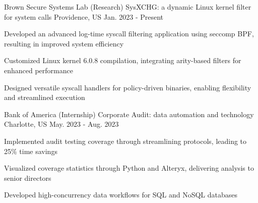 \begin{cventries}

  \cventry
    {Brown Secure Systems Lab}
    {(Research) SysXCHG: a dynamic Linux kernel filter for system calls}
    {Providence, US}
    {Jan. 2023 - Present}
    {
      \begin{cvitems}
        \item {Developed an advanced log-time syscall filtering application using seccomp BPF, resulting in improved system efficiency}
        \item {Customized Linux kernel 6.0.8 compilation, integrating arity-based filters for enhanced performance}
        \item {Designed versatile syscall handlers for policy-driven binaries, enabling flexibility and streamlined execution}      
      \end{cvitems}
    }
  
    \begin{comment}
  \cventry
    {Zhejiang University(advisor: Wenbo Shen)}
    {(Research) Interp-flow Hijacking: Non-control Data Attack via Hijacking eBPF Interpretation Flow} 
    {Providence, US}
    {Sep. 2023 - Present}
    {
      \begin{cvitems}
        \item {A novel method to hijack eBPF interpretation flow, increasing kernel attack capability}
        \item {Edited, reviewed, and proofread the paper before submission, ensuring quality and accuracy}
        \item {Conducted comprehensive background research in the areas of eBPF and kernel security}
      \end{cvitems}
    }


  \cventry
    {Brown University}
    {(Research) Microservice benchmarking}
    {Providence, US}
    {Sep. 2023 - PRESENT}
    {
      \begin{cvitems}
        \item {Analyzing and evaluating microservice frameworks employed by Meta and Alibaba}
        \item {Designing a realistic data pipeline for microservice benchmarking}
      \end{cvitems}
    }
\end{comment}

  \cventry
    {Bank of America}
    {(Internship) Corporate Audit: data automation and technology}
    {Charlotte, US}
    {May. 2023 - Aug. 2023}
    {
      \begin{cvitems}
        \item {Implemented audit testing coverage through streamlining protocols, leading to 25\% time savings}
        \item {Visualized coverage statistics through Python and Alteryx, delivering analysis to senior directors}
        \item {Developed high-concurrency data workflows for SQL and NoSQL databases}
      \end{cvitems}
    }


\end{cventries}
